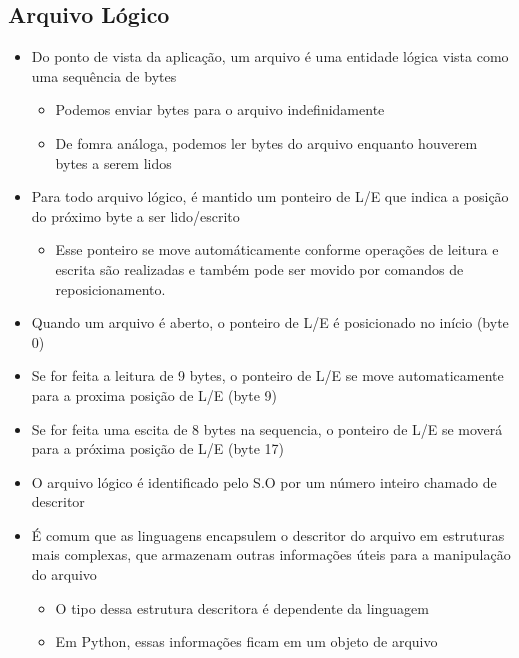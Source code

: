 \documentclass[12pt]{article}
\begin{document}
    \subsection{Arquivo Lógico}
    \begin{itemize}
        \item Do ponto de vista da aplicação, um arquivo é uma entidade 
        lógica vista como uma sequência de bytes
        \begin{itemize}
            \item Podemos enviar bytes para o arquivo indefinidamente
            \item De fomra análoga, podemos ler bytes do arquivo enquanto 
            houverem bytes a serem lidos
        \end{itemize}
        \item Para todo arquivo lógico, é mantido um ponteiro de L/E que 
        indica a posição do próximo byte a ser lido/escrito
        \begin{itemize}
            \item Esse ponteiro se move automáticamente conforme operações 
            de leitura e escrita são realizadas e também pode ser movido 
            por comandos de reposicionamento.
        \end{itemize}
        \item Quando um arquivo é aberto, o ponteiro de L/E é posicionado 
        no início (byte 0)

        \item Se for feita a leitura de 9 bytes, o ponteiro de L/E se move 
        automaticamente para a proxima posição de L/E (byte 9) 

        \item Se for feita uma escita de 8 bytes na sequencia, o ponteiro 
        de L/E se moverá para a próxima posição de L/E (byte 17)

        \item O arquivo lógico é identificado pelo S.O por um número 
        inteiro chamado de descritor
        \item É comum que as linguagens encapsulem o descritor do arquivo 
        em estruturas mais complexas, que armazenam outras informações úteis 
        para a manipulação do arquivo
        \begin{itemize}
            \item O tipo dessa estrutura descritora é dependente da linguagem
            \item Em Python, essas informações ficam em um objeto de arquivo
        \end{itemize}
    \end{itemize}
\end{document}
